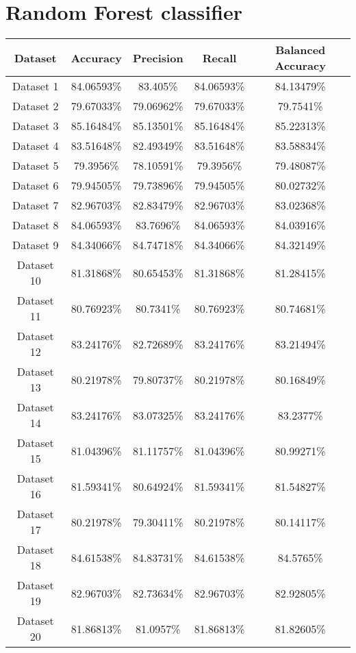 \section{Random Forest classifier}
\begin{center}
\begin{tabular}{ |c||c|c|c|c| } 
    \hline
    Dataset & Accuracy & Precision & Recall & Balanced Accuracy\\ 
    \hline\hline
    Dataset 1&84.06593\%&83.405\%&84.06593\%&84.13479\%\\
    \hline
    Dataset 2&79.67033\%&79.06962\%&79.67033\%&79.7541\%\\
    \hline
    Dataset 3&85.16484\%&85.13501\%&85.16484\%&85.22313\%\\
    \hline
    Dataset 4&83.51648\%&82.49349\%&83.51648\%&83.58834\%\\
    \hline
    Dataset 5&79.3956\%&78.10591\%&79.3956\%&79.48087\%\\
    \hline
    Dataset 6&79.94505\%&79.73896\%&79.94505\%&80.02732\%\\
    \hline
    Dataset 7&82.96703\%&82.83479\%&82.96703\%&83.02368\%\\
    \hline
    Dataset 8&84.06593\%&83.7696\%&84.06593\%&84.03916\%\\
    \hline
    Dataset 9&84.34066\%&84.74718\%&84.34066\%&84.32149\%\\
    \hline
    Dataset 10&81.31868\%&80.65453\%&81.31868\%&81.28415\%\\
    \hline
    Dataset 11&80.76923\%&80.7341\%&80.76923\%&80.74681\%\\
    \hline
    Dataset 12&83.24176\%&82.72689\%&83.24176\%&83.21494\%\\
    \hline
    Dataset 13&80.21978\%&79.80737\%&80.21978\%&80.16849\%\\
    \hline
    Dataset 14&83.24176\%&83.07325\%&83.24176\%&83.2377\%\\
    \hline
    Dataset 15&81.04396\%&81.11757\%&81.04396\%&80.99271\%\\
    \hline
    Dataset 16&81.59341\%&80.64924\%&81.59341\%&81.54827\%\\
    \hline
    Dataset 17&80.21978\%&79.30411\%&80.21978\%&80.14117\%\\
    \hline
    Dataset 18&84.61538\%&84.83731\%&84.61538\%&84.5765\%\\
    \hline
    Dataset 19&82.96703\%&82.73634\%&82.96703\%&82.92805\%\\
    \hline
    Dataset 20&81.86813\%&81.0957\%&81.86813\%&81.82605\%\\

\end{tabular}
\end{center}
